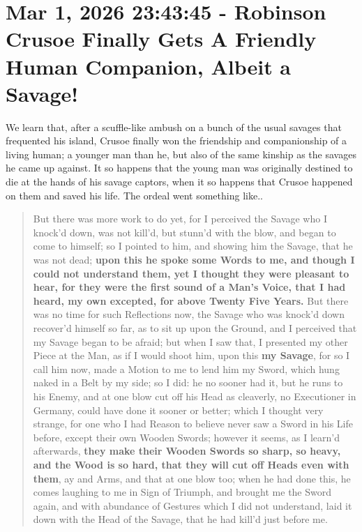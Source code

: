 \documentclass[a4paper]{article}
\begin{document}
\section{Mar 1, 2026 23:43:45 - Robinson Crusoe Finally Gets A Friendly Human Companion, Albeit a Savage!}
\label{SEC50}


We learn that, after a scuffle-like ambush on a bunch of the usual savages that frequented his island, Crusoe finally won the friendship and companionship of a living human; a younger man than he, but also of the same kinship as the savages he came up against. It so happens that the young man was originally destined to die at the hands of his savage captors, when it so happens that Crusoe happened on them and saved his life. The ordeal went something like..


\noindent
\begin{minipage}{1\textwidth}
\vspace{1em}
\begin{quotation}
{\ttfamily


But there was more work to do yet, for I perceived the Savage who I knock’d down, was not kill’d, but stunn’d with the blow, and began to come to himself; so I pointed to him, and showing him the Savage, that he was not dead; \textbf{upon this he spoke some Words to me, and though I could not understand them, yet I thought they were pleasant to hear, for they were the first sound of a Man’s Voice, that I had heard, my own excepted, for above Twenty Five Years.} But there was no time for such Reflections now, the Savage who was knock’d down recover’d himself so far, as to sit up upon the Ground, and I perceived that my Savage began to be afraid; but when I saw that, I presented my other Piece at the Man, as if I would shoot him, upon this \textbf{my Savage}, for so I call him now, made a Motion to me to lend him my Sword, which hung naked in a Belt by my side; so I did: he no sooner had it, but he runs to his Enemy, and at one blow cut off his Head as cleaverly, no Executioner in Germany, could have done it sooner or better; which I thought very strange, for one who I had Reason to believe never saw a Sword in his Life before, except their own Wooden Swords; however it seems, as I learn’d afterwards, \textbf{they make their Wooden Swords so sharp, so heavy, and the Wood is so hard, that they will cut off Heads even with them}, ay and Arms, and that at one blow too; when he had done this, he comes laughing to me in Sign of Triumph, and brought me the Sword again, and with abundance of Gestures which I did not understand, laid it down with the Head of the Savage, that he had kill’d just before me.


}
\end{quotation}
\vspace{1em}
\end{minipage}
\end{document}
